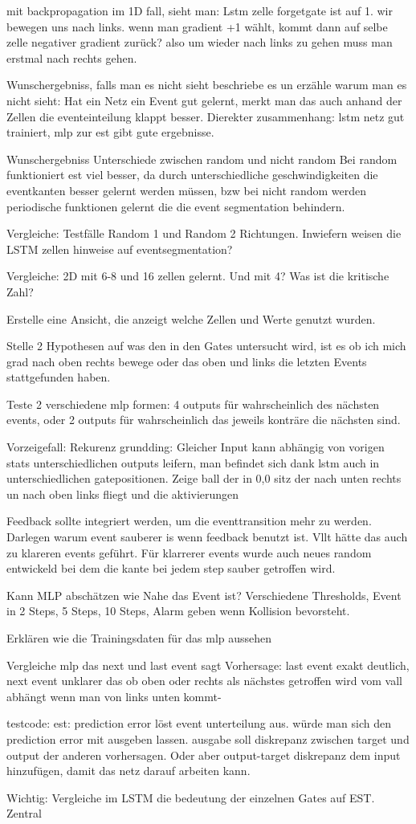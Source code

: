 mit backpropagation im 1D fall, sieht man: Lstm zelle forgetgate ist auf 1. wir bewegen uns nach links. wenn man gradient +1 wählt, kommt dann auf selbe zelle negativer gradient zurück? also um wieder nach links zu gehen muss man erstmal nach rechts gehen. 

Wunschergebniss, falls man es nicht sieht beschriebe es un erzähle warum man es nicht sieht: 
Hat ein Netz ein Event gut gelernt, merkt man das auch anhand der Zellen die eventeinteilung klappt besser.
Dierekter zusammenhang: lstm netz gut trainiert, mlp zur est gibt gute ergebnisse.

Wunschergebniss
Unterschiede zwischen random und nicht random
Bei random funktioniert est viel besser,  da  durch unterschiedliche geschwindigkeiten die eventkanten besser gelernt werden müssen, bzw bei nicht random werden periodische funktionen gelernt die die event segmentation behindern.

Vergleiche: Testfälle Random 1 und Random 2 Richtungen. Inwiefern weisen die LSTM zellen hinweise auf eventsegmentation? 

Vergleiche: 2D mit 6-8 und 16 zellen gelernt.
Und mit 4? Was ist die kritische Zahl?

Erstelle eine Ansicht, die anzeigt welche Zellen und Werte genutzt wurden.

Stelle 2 Hypothesen auf was den in den Gates untersucht wird, ist es ob ich mich grad nach oben rechts bewege oder das oben und links die letzten Events stattgefunden haben.

Teste 2 verschiedene mlp formen: 4 outputs für wahrscheinlich des nächsten events,
oder 2 outputs für wahrscheinlich das jeweils konträre die nächsten sind.


Vorzeigefall: Rekurenz grundding: Gleicher Input kann abhängig von vorigen stats unterschiedlichen outputs leifern, man befindet sich dank lstm auch in unterschiedlichen gatepositionen.
Zeige ball der in 0,0 sitz der nach unten rechts un nach oben links fliegt und die aktivierungen

Feedback sollte integriert werden, um die eventtransition mehr zu werden. Darlegen warum event sauberer is wenn feedback benutzt ist. Vllt hätte das auch zu klareren events geführt. Für klarrerer events wurde auch neues random entwickeld bei dem die kante bei jedem step sauber getroffen wird.

Kann MLP abschätzen wie Nahe das Event ist?
Verschiedene Thresholds, Event in 2 Steps, 5 Steps, 10 Steps, Alarm geben wenn Kollision bevorsteht.

Erklären wie die Trainingsdaten für das mlp aussehen

Vergleiche mlp das next und last event sagt
Vorhersage: last event exakt deutlich, next event unklarer das ob oben oder rechts als nächstes getroffen wird vom vall abhängt wenn man von links unten kommt-

testcode:
est: prediction error löst event unterteilung aus. würde man sich den prediction error mit ausgeben lassen. ausgabe soll diskrepanz zwischen target und output der anderen vorhersagen. Oder aber output-target diskrepanz dem input hinzufügen, damit das netz darauf arbeiten kann. 

Wichtig:
Vergleiche im LSTM die bedeutung der einzelnen Gates auf EST. Zentral
